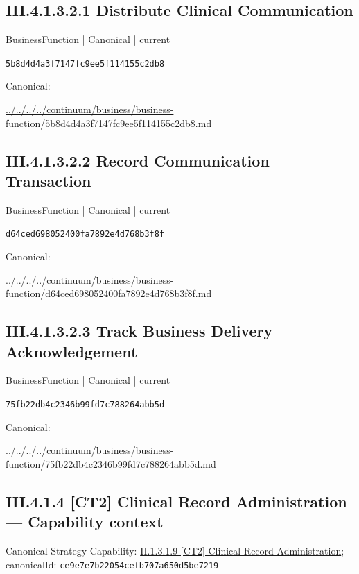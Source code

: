 \documentclass[10pt,a4paper]{article}
\begin{document}
\subsection*{III.4.1.3.2.1 Distribute Clinical Communication}
\label{element-5b8d4d4a3f7147fc9ee5f114155c2db8}
{\small BusinessFunction | Canonical | current}\par
\texttt{5b8d4d4a3f7147fc9ee5f114155c2db8}\par
Canonical: \par
{\footnotesize\url{../../../../continuum/business/business-function/5b8d4d4a3f7147fc9ee5f114155c2db8.md}}\par
\subsection*{III.4.1.3.2.2 Record Communication Transaction}
\label{element-d64ced698052400fa7892e4d768b3f8f}
{\small BusinessFunction | Canonical | current}\par
\texttt{d64ced698052400fa7892e4d768b3f8f}\par
Canonical: \par
{\footnotesize\url{../../../../continuum/business/business-function/d64ced698052400fa7892e4d768b3f8f.md}}\par
\subsection*{III.4.1.3.2.3 Track Business Delivery Acknowledgement}
\label{element-75fb22db4c2346b99fd7c788264abb5d}
{\small BusinessFunction | Canonical | current}\par
\texttt{75fb22db4c2346b99fd7c788264abb5d}\par
Canonical: \par
{\footnotesize\url{../../../../continuum/business/business-function/75fb22db4c2346b99fd7c788264abb5d.md}}\par
\subsection*{III.4.1.4 [CT2] Clinical Record Administration — Capability context}
Canonical Strategy Capability: \hyperref[element-ce9e7e7b22054cefb707a650d5be7219]{II.1.3.1.9 [CT2] Clinical Record Administration}; canonicalId: \texttt{ce9e7e7b22054cefb707a650d5be7219}\par
\end{document}
